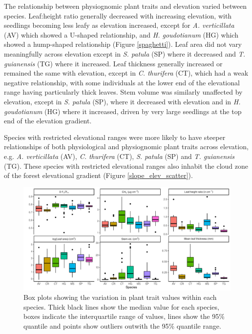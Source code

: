 \documentclass[a4paper, 11pt]{article}
\begin{document}
The relationship between physiognomic plant traits and elevation varied between species. Leaf:height ratio generally decreased with increasing elevation, with seedlings becoming less leafy as elevation increased, except for \textit{A. verticillata} (AV) which showed a U-shaped relationship, and \textit{H. goudotianum} (HG) which showed a hump-shaped relationship (Figure \ref{spaghetti}). Leaf area did not vary meaningfully across elevation except in \textit{S. patula} (SP) where it decreased and \textit{T. guianensis} (TG) where it increased. Leaf thickness generally increased or remained the same with elevation, except in \textit{C. thurifera} (CT), which had a weak negative relationship, with some individuals at the lower end of the elevational range having particularly thick leaves. Stem volume was similarly unaffected by elevation, except in \textit{S. patula} (SP), where it decreased with elevation and in \textit{H. goudotianum} (HG) where it increased, driven by very large seedlings at the top end of the elevation gradient.

Species with restricted elevational ranges were more likely to have steeper relationships of both physiological and physiognomic plant traits across elevation, e.g. \textit{A. verticillata} (AV), \textit{C. thurifera} (CT), \textit{S. patula} (SP) and \textit{T. guianensis} (TG). These species with restricted elevational ranges also inhabit the cloud zone of the forest elevational gradient (Figure \ref{slope_elev_scatter}).

\begin{figure}[H]
\includegraphics[width=\textwidth]{box}
\centering
\caption{Box plots showing the variation in plant trait values within each species. Thick black lines show the median value for each species, boxes indicate the interquartile range of values, lines show the 95\% quantile and points show outliers outwith the 95\% quantile range.}
\label{box}
\end{figure}
\end{document}
